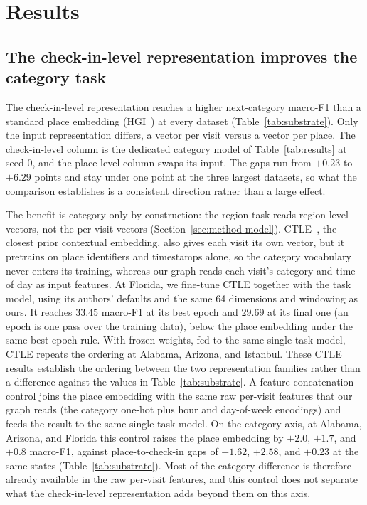 \section{Results}
\label{sec:results}

\subsection{The check-in-level representation improves the category task}
\label{sec:results-part1}
The check-in-level representation reaches a higher next-category macro-F1 than a standard place
embedding (HGI~\cite{huang2023hgi}) at every dataset
(Table~\ref{tab:substrate}). Only the input representation differs, a vector per visit versus a vector per place. The check-in-level column is the dedicated category model of Table~\ref{tab:results} at seed 0, and the place-level column swaps its input.
The gaps run from $+0.23$ to $+6.29$ points and stay under one point at the three largest
datasets, so what the comparison establishes is a consistent direction rather than a large effect.

The benefit is category-only by construction: the region task reads region-level vectors, not the
per-visit vectors (Section~\ref{sec:method-model}).
CTLE~\cite{lin2021ctle}, the closest prior contextual embedding, also gives each visit its own vector, but it pretrains on place identifiers and timestamps alone, so the category vocabulary never enters its training, whereas our graph reads each visit's category and time of day as input features. At Florida, we fine-tune CTLE together with the task model, using its authors' defaults and the same 64 dimensions and windowing as ours. It reaches $33.45$ macro-F1 at its best epoch and $29.69$ at its final one (an epoch is one pass over the training data), below the place embedding under the same best-epoch rule.
With frozen weights, fed to the same single-task model, CTLE repeats the ordering at Alabama, Arizona, and Istanbul. These CTLE results establish the ordering between the two representation families rather than a
difference against the values in Table~\ref{tab:substrate}.
A feature-concatenation control joins the place embedding with the same raw
per-visit features that our graph reads (the category one-hot plus hour and
day-of-week encodings) and feeds the result to the same single-task model. On
the category axis, at Alabama, Arizona, and Florida this control raises the
place embedding by $+2.0$, $+1.7$, and $+0.8$ macro-F1, against
place-to-check-in gaps of $+1.62$, $+2.58$, and $+0.23$ at the same states
(Table~\ref{tab:substrate}). Most of the category difference is
therefore already available in the raw per-visit features, and this control does not separate
what the check-in-level representation adds beyond them on this axis.




